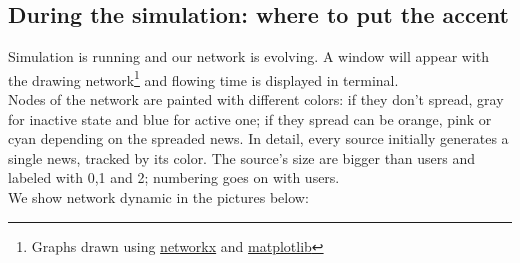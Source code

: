 \subsection{During the simulation: where to put the accent}\label{subsec:during}
Simulation is running and our network is evolving. A window will appear
with the drawing network\footnote{Graphs drawn using
  \href{https://networkx.github.io/}{networkx} and
  \href{https://matplotlib.org/}{matplotlib}}
and flowing time is displayed in terminal. \\
Nodes of the network are painted with different colors: if they don't
spread, gray for inactive state and blue for active one; if they spread can be orange, pink or cyan depending on the spreaded news.
In detail, every source initially generates a single news, tracked by its color. The source's size are bigger than users and labeled with 0,1 and 2; numbering goes on with users.\\
We show network dynamic in the pictures below:
